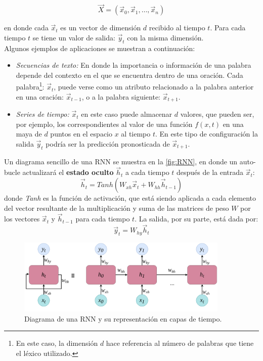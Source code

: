 \begin{equation}
  \label{eq:xdataRNN}
  \vec{X} = (\vec{x}_0, \vec{x}_1, \dots , \vec{x}_n)
\end{equation}

en donde cada $\vec{x}_t$ es un vector de dimensión $d$ recibido al tiempo $t$. Para cada tiempo $t$ se tiene un valor de salida: $\vec{y}_t$ con la misma dimensión.
\\
Algunos ejemplos de aplicaciones se muestran a continuación:

\begin{itemize}[label=\textcolor{CTtitle}{\textbullet}]
\item \emph{Secuencias de texto:} En donde la importancia o información de una palabra depende del contexto en el que se encuentra dentro de una oración. Cada palabra\footnote{En este caso, la dimensión $d$ hace referencia al número de palabras que tiene el léxico utilizado.}: $\vec{x}_t$,  puede verse como un atributo relacionado a la palabra anterior en una oración: $\vec{x}_{t-1}$, o a la palabra siguiente: $\vec{x}_{t+1}$.
 \item \emph{Series de tiempo:} $\vec{x}_t$ en este caso puede almacenar $d$ valores, que pueden ser, por ejemplo, los correspondientes al valor de una función $f(x,t)$ en una maya de $d$ puntos en el espacio $x$ al tiempo $t$. En este tipo de configuración la salida $\vec{y}_t$ podría ser la predicción pronosticada de $\vec{x}_{t+1}$.
 \end{itemize}
  
Un diagrama sencillo de una \acs{RNN} se muestra en la \autoref{fig:RNN}, en donde un auto-bucle actualizará el \textbf{estado oculto} $\vec{h}_t$ a cada tiempo $t$ después de la entrada $\vec{x}_t$:
\begin{equation}
  \label{eq:hidden}
  \vec{h}_t = Tanh(W_{xh}\vec{x}_t + W_{hh} \vec{h}_{t-1})
\end{equation}
donde \emph{Tanh} es la función de activación, que está siendo aplicada a cada elemento del vector resultante de la multiplicación y suma de las matrices de peso $W$ por los vectores $\vec{x}_t$ y $\vec{h}_{t-1}$ para cada tiempo $t$. La salida, por su parte, está dada por:
\begin{equation}
  \vec{y}_t = W_{hy}\vec{h}_t
\end{equation}

\begin{figure}[!htbp]
  \centering
  \includegraphics[width=0.9\textwidth]{./img/RNN.png}
  \caption{Diagrama de una \acs{RNN} y su representación en capas de tiempo.}
  \label{fig:RNN}
\end{figure}

